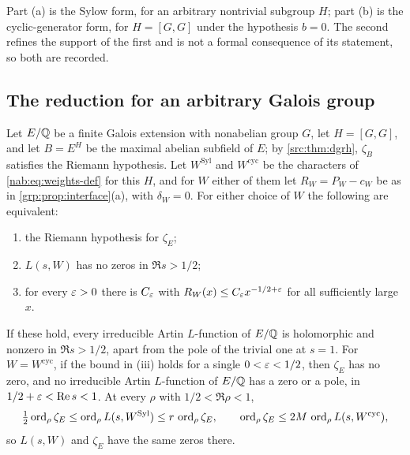 Part (a) is the Sylow form, for an arbitrary nontrivial subgroup $H$; part (b) is the
cyclic-generator form, for $H=[G,G]$ under the hypothesis $b=0$. The second refines the
support of the first and is not a formal consequence of its statement, so both are
recorded.

\subsection{The reduction for an arbitrary Galois group}\label{nab:sec:sylow}
\begingroup\raggedright
{}
\endgroup

\begin{theorem}\label{nab:thm:sylow}
Let $E/\mathbb{Q}$ be a finite Galois extension with nonabelian group $G$, let $H=[G,G]$, and let
$B=E^H$ be the maximal abelian subfield of $E$; by \cref{src:thm:dgrh}, $\zeta_B$ satisfies
the Riemann hypothesis. Let $W^{\mathrm{Syl}}$ and $W^{\mathrm{cyc}}$ be the characters of
\eqref{nab:eq:weights-def} for this $H$, and for $W$ either of them let $R_W=P_W-c_W$ be as
in \cref{grp:prop:interface}(a), with $\delta_W=0$. For either choice of $W$ the following are
equivalent:
\begin{enumerate}[label=\textup{(\roman*)}]
\item the Riemann hypothesis for $\zeta_E$;
\item $L(s,W)$ has no zeros in $\Re s>1/2$;
\item for every $\varepsilon>0$ there is $C_\varepsilon$ with $R_W(x)\le C_\varepsilon x^{-1/2+\varepsilon}$ for all
sufficiently large $x$.
\end{enumerate}
If these hold, every irreducible Artin $L$-function of $E/\mathbb{Q}$ is holomorphic and nonzero in
$\Re s>1/2$, apart from the pole of the trivial one at $s=1$. For $W=W^{\mathrm{cyc}}$, if
the bound in \textup{(iii)} holds for a single $0<\varepsilon<1/2$, then $\zeta_E$ has no zero,
and no irreducible Artin $L$-function of $E/\mathbb{Q}$ has a zero or a pole, in
$1/2+\varepsilon<\operatorname{Re} s<1$. At every $\rho$ with $1/2<\Re\rho<1$,
\begin{equation}\label{nab:eq:mult}
 \tfrac12\operatorname{ord}_\rho\zeta_E\le\operatorname{ord}_\rho L(s,W^{\mathrm{Syl}})\le r\,\operatorname{ord}_\rho\zeta_E,
 \qquad
 \operatorname{ord}_\rho\zeta_E\le2M\,\operatorname{ord}_\rho L(s,W^{\mathrm{cyc}}),
\end{equation}
so $L(s,W)$ and $\zeta_E$ have the same zeros there.
\end{theorem}
